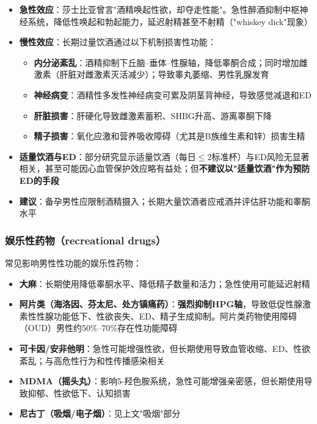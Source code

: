 \documentclass[12pt,a4paper,twoside]{ctexbook}
\begin{document}
\begin{itemize}[leftmargin=2cm]
	\item \textbf{急性效应}：莎士比亚曾言"酒精唤起性欲，却夺走性能"。急性醉酒抑制中枢神经系统，降低性唤起和勃起能力，延迟射精甚至不射精（"whiskey dick"现象）
	\item \textbf{慢性效应}：长期过量饮酒通过以下机制损害性功能：
    \begin{itemize}
    	\item \textbf{内分泌紊乱}：酒精抑制下丘脑--垂体--性腺轴，降低睾酮合成；同时增加雌激素（肝脏对雌激素灭活减少）；导致睾丸萎缩、男性乳腺发育
    	\item \textbf{神经病变}：酒精性多发性神经病变可累及阴茎背神经，导致感觉减退和ED
    	\item \textbf{肝脏损害}：肝硬化导致雌激素蓄积、SHBG升高、游离睾酮下降
    	\item \textbf{精子损害}：氧化应激和营养吸收障碍（尤其是B族维生素和锌）损害生精
    \end{itemize}
	\item \textbf{适量饮酒与ED}：部分研究显示适量饮酒（每日$\le$2标准杯）与ED风险无显著相关，甚至可能因心血管保护效应略有益处；但\textbf{不建议以"适量饮酒"作为预防ED的手段}
	\item \textbf{建议}：备孕男性应限制酒精摄入；长期大量饮酒者应戒酒并评估肝功能和睾酮水平
\end{itemize}

\subsubsection{娱乐性药物（recreational drugs）}

常见影响男性性功能的娱乐性药物：

\begin{itemize}[leftmargin=2cm]
	\item \textbf{大麻}：长期使用降低睾酮水平、降低精子数量和活力；急性使用可能延迟射精
	\item \textbf{阿片类（海洛因、芬太尼、处方镇痛药）}：\textbf{强烈抑制HPG轴}，导致低促性腺激素性性腺功能低下、性欲丧失、ED、精子生成抑制。阿片类药物使用障碍（OUD）男性约50\%--70\%存在性功能障碍
	\item \textbf{可卡因/安非他明}：急性可能增强性欲，但长期使用导致血管收缩、ED、性欲紊乱；与高危性行为和性传播感染相关
	\item \textbf{MDMA（摇头丸）}：影响5-羟色胺系统，急性可能增强亲密感，但长期使用导致抑郁、性欲低下、认知损害
	\item \textbf{尼古丁（吸烟/电子烟）}：见上文"吸烟"部分
\end{itemize}
\end{document}
